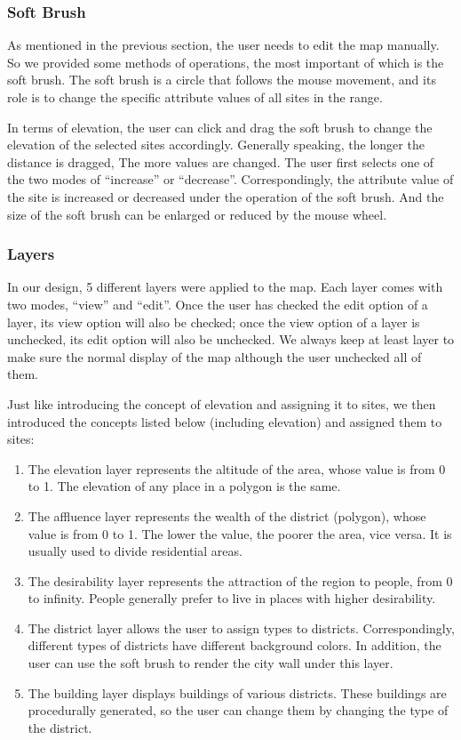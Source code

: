 \subsubsection{Soft Brush}
As mentioned in the previous section, the user needs to edit the map manually. So we provided some methods of operations, the most important of which is the soft brush. The soft brush is a circle that follows the mouse movement, and its role is to change the specific attribute values of all sites in the range.

In terms of elevation, the user can click and drag the soft brush to change the elevation of the selected sites accordingly. Generally speaking, the longer the distance is dragged, The more values are changed. The user first selects one of the two modes of ``increase'' or ``decrease''. Correspondingly, the attribute value of the site is increased or decreased under the operation of the soft brush. And the size of the soft brush can be enlarged or reduced by the mouse wheel.

\subsubsection{Layers}
In our design, 5 different layers were applied to the map. Each layer comes with two modes, ``view'' and ``edit''. Once the user has checked the edit option of a layer, its view option will also be checked; once the view option of a layer is unchecked, its edit option will also be unchecked. We always keep at least layer to make sure the normal display of the map although the user unchecked all of them.

Just like introducing the concept of elevation and assigning it to sites, we then introduced the concepts listed below (including elevation) and assigned them to sites:

\begin{enumerate}
  \item The elevation layer represents the altitude of the area, whose value is from 0 to 1. The elevation of any place in a polygon is the same.
  \item The affluence layer represents the wealth of the district (polygon), whose value is from 0 to 1. The lower the value, the poorer the area, vice versa. It is usually used to divide residential areas.
  \item The desirability layer represents the attraction of the region to people, from 0 to infinity. People generally prefer to live in places with higher desirability.
  \item The district layer allows the user to assign types to districts. Correspondingly, different types of districts have different background colors. In addition, the user can use the soft brush to render the city wall under this layer.
  \item The building layer displays buildings of various districts. These buildings are procedurally generated, so the user can change them by changing the type of the district.
\end{enumerate}

